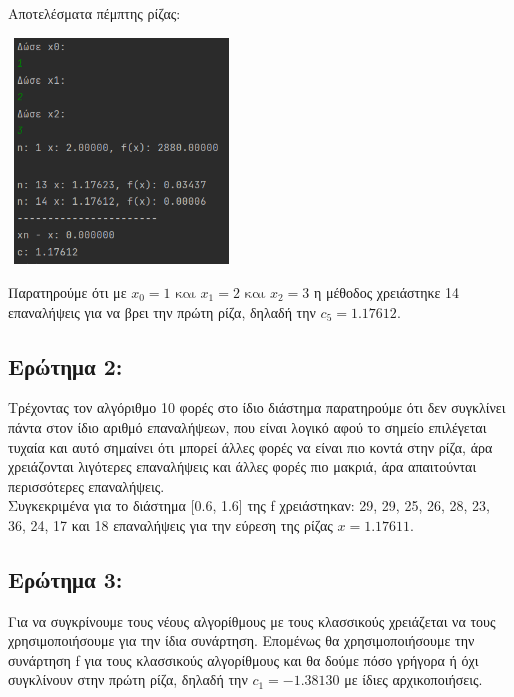 \documentclass{article}
\begin{document}
    \pagebreak
    \vspace{3mm}
    Αποτελέσματα πέμπτης ρίζας: \\
    \begin{center}\includegraphics[width = 6cm, height = 6cm]{images/results_21.png}\end{center}
    Παρατηρούμε ότι με \(x_0 = 1 \text{ και } x_1 = 2 \text{ και } x_2 = 3\) η μέθοδος χρειάστηκε 14 επαναλήψεις για να βρει την πρώτη ρίζα, δηλαδή την \(c_5 = 1.17612\).
    
    
\subsection{Ερώτημα 2:}
Τρέχοντας τον αλγόριθμο 10 φορές στο ίδιο διάστημα παρατηρούμε ότι δεν συγκλίνει πάντα στον ίδιο αριθμό επαναλήψεων, που είναι λογικό αφού το σημείο επιλέγεται τυχαία και αυτό σημαίνει ότι μπορεί άλλες φορές να είναι πιο κοντά στην ρίζα, άρα χρειάζονται λιγότερες επαναλήψεις και άλλες φορές πιο μακριά, άρα απαιτούνται περισσότερες επαναλήψεις. \\

Συγκεκριμένα για το διάστημα [0.6, 1.6] της f χρειάστηκαν: 29, 29, 25, 26, 28, 23, 36, 24, 17 και 18 επαναλήψεις για την εύρεση της ρίζας \(x = 1.17611\).

\subsection{Ερώτημα 3:}
Για να συγκρίνουμε τους νέους αλγορίθμους με τους κλασσικούς χρειάζεται να τους χρησιμοποιήσουμε για την ίδια συνάρτηση. Επομένως θα χρησιμοποιήσουμε την συνάρτηση f για τους κλασσικούς αλγορίθμους και θα δούμε πόσο γρήγορα ή όχι συγκλίνουν στην πρώτη ρίζα, δηλαδή την \(c_1 = -1.38130\) με ίδιες αρχικοποιήσεις. \\
\end{document}
